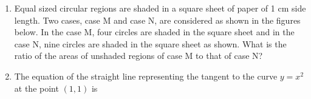 \documentclass[journal]{IEEEtran}
\begin{document}
\begin{enumerate}
{        }
    \item{
           Equal sized circular regions are shaded in a square sheet of paper of 1 cm side
           length. Two cases, case M and case N, are considered as shown in the figures
           below. In the case M, four circles are shaded in the square sheet and in the case
           N, nine circles are shaded in the square sheet as shown.
           What is the ratio of the areas of unshaded regions of case M to that of case N?  
           \begin{center}
           \end{center}
            \begin{enumerate}
            	\begin{multicols}{4}
            		\item 2 : 3
            		\item 1 : 1
            		\item 3 : 2
            		\item 2 : 1 
            	\end{multicols}
            \end{enumerate}
        }
    \item{
        
           	The equation of the straight line representing the tangent to the curve \( y = x^2 \) at the point \((1,1)\) is
           	\begin{multicols}{4}
           		

\end{multicols}}
\end{enumerate}
\end{document}
